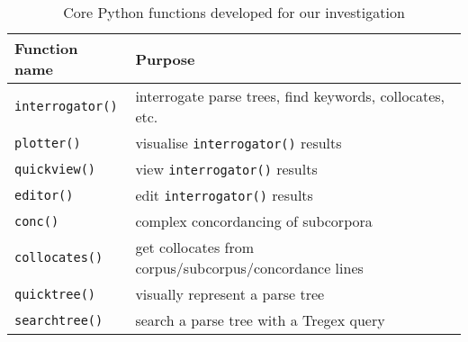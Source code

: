 \begin{table}[h!]
\small
\centering
\begin{tabularx}{0.75\textwidth}{lX} \toprule

\textbf{Function name} &  \textbf{Purpose}     \\ \midrule
\texttt{interrogator()}  &  interrogate parse trees, find keywords, collocates, etc.    \\ 
\texttt{plotter()}       &  visualise \texttt{interrogator()} results  \\ 
\texttt{quickview()}     &  view \texttt{interrogator()} results       \\ 
\texttt{editor()}       &  edit \texttt{interrogator()} results       \\ 
\texttt{conc()}          &  complex concordancing of subcorpora  \\ 
\texttt{collocates()}          &  get collocates from corpus\slash subcorpus\slash concordance lines \\ 
\texttt{quicktree()}          &  visually represent a parse tree  \\ 
\texttt{searchtree()}          &  search a parse tree with a Tregex query  \\ \bottomrule
\end{tabularx}
\caption{Core Python functions developed for our investigation}
\label{tab:pyfunc}
\end{table}


